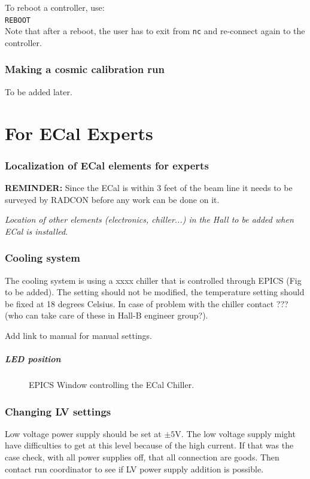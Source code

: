 \documentclass[12pt]{article}
\begin{document}
      To reboot a controller, use:\\
      \texttt{REBOOT}\\
      Note that after a reboot, the user has to exit from \texttt{nc} and re-connect again to the controller.


   \section{Making a cosmic calibration run}

   To be added later.


\part{For ECal Experts}

   \section{Localization of ECal elements for experts}

{\bf REMINDER:} Since the ECal is within 3 feet of the beam line it needs to be surveyed by RADCON before any work can be done on it.

{\it Location of other elements (electronics, chiller...) in the Hall to be added when ECal is installed.}

   \section{Cooling system}

     The cooling system is using a xxxx chiller that is controlled through EPICS (Fig to be added). The setting should not be modified, the temperature setting should be fixed at 18 degrees Celsius. In case of problem with the chiller contact ??? (who can take care of these in Hall-B engineer group?).

     Add link to manual for manual settings.

\subsubsection{LED position}
\begin{figure}
\center
\caption{\small \label{Chiller} EPICS Window controlling the ECal Chiller.}
\end{figure}



   \section{Changing LV settings}
      Low voltage power supply should be set at $\pm5$V. The low voltage supply might have difficulties to get at this level because of the high current. If that was the case check, with all power supplies off, that all connection are goods. Then contact run coordinator to see if LV power supply addition is possible. 
\end{document}
